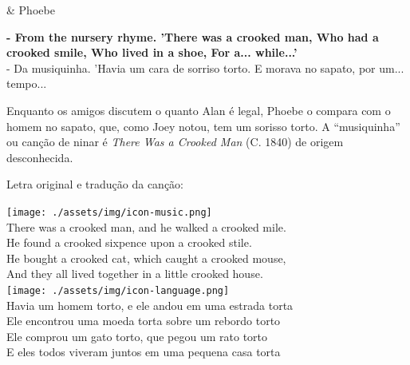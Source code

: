 \begin{tcolorbox}[enhanced,center upper,
    drop fuzzy shadow southeast, boxrule=0.3pt,
    lower separated=false, breakable,
    colframe=black!30!dialogoBorder,colback=white]
\begin{minipage}[c]{0.16\linewidth}
   & \centering \scriptsize{Phoebe}
\end{minipage}
\hfill
\begin{minipage}[c]{0.8\linewidth}
  \textbf{- From the nursery rhyme. 'There was a crooked man, Who had a crooked smile, Who lived in a shoe, For a... while...'}\\
  - Da musiquinha. 'Havia um cara de sorriso torto. E morava no sapato, por um... tempo...
\end{minipage}
\end{tcolorbox}

Enquanto os amigos discutem o quanto Alan é legal, Phoebe o compara com
o homem no sapato, que, como Joey notou, tem um sorisso torto. A
``musiquinha'' ou canção de ninar é \emph{There Was a Crooked Man} (C.
1840) de origem desconhecida.

Letra original e tradução da canção:

\bigskip
\begin{tcolorbox}[enhanced,
    drop fuzzy shadow southeast, boxrule=0.3pt,
    lower separated=false, sidebyside, sidebyside align=top,
    halign=flush right, halign lower=left, breakable,
    colframe=black!30!dialogoBorder,colback=musicaBg]
\texttt{[image: ./assets/img/icon-music.png]}\\
There was a crooked man, and he walked a crooked mile.\\He found a crooked sixpence upon a crooked stile.\\He bought a crooked cat, which caught a crooked mouse,\\And they all lived together in a little crooked house.\\
\tcblower
\texttt{[image: ./assets/img/icon-language.png]}\\
Havia um homem torto, e ele andou em uma estrada torta\\Ele encontrou uma moeda torta sobre um rebordo torto\\Ele comprou um gato torto, que pegou um rato torto\\E eles todos viveram juntos em uma pequena casa torta\\
\end{tcolorbox}

